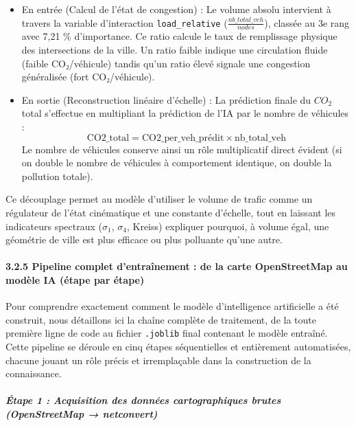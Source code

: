 \documentclass[10pt, a4paper]{article}
\providecommand{\tightlist}{}
\begin{document}
\begin{enumerate}
  \begin{itemize}
  \tightlist
  \item
    En entrée (Calcul de l'état de congestion) : Le volume absolu
    intervient à travers la variable d'interaction
    \texttt{load\_relative} (\(\frac{nb\_total\_veh}{nodes}\)), classée
    au 3e rang avec 7,21 \% d'importance. Ce ratio calcule le taux de
    remplissage physique des intersections de la ville. Un ratio faible
    indique une circulation fluide (faible CO₂/véhicule) tandis qu'un
    ratio élevé signale une congestion généralisée (fort CO₂/véhicule).
  \item
    En sortie (Reconstruction linéaire d'échelle) : La prédiction finale
    du \(CO_2\) total s'effectue en multipliant la prédiction de l'IA
    par le nombre de véhicules :
    \[\text{CO2\_total} = \text{CO2\_per\_veh\_prédit} \times \text{nb\_total\_veh}\]
    Le nombre de véhicules conserve ainsi un rôle multiplicatif direct
    évident (si on double le nombre de véhicules à comportement
    identique, on double la pollution totale).
  \end{itemize}
\end{enumerate}

Ce découplage permet au modèle d'utiliser le volume de trafic comme un
régulateur de l'état cinématique et une constante d'échelle, tout en
laissant les indicateurs spectraux (\(\sigma_1\), \(\sigma_4\), Kreiss)
expliquer pourquoi, à volume égal, une géométrie de ville est plus
efficace ou plus polluante qu'une autre.

\paragraph{3.2.5 Pipeline complet d'entraînement : de la carte
OpenStreetMap au modèle IA (étape par
étape)}\label{pipeline-complet-dentrauxeenement-de-la-carte-openstreetmap-au-moduxe8le-ia-uxe9tape-par-uxe9tape}

Pour comprendre exactement comment le modèle d'intelligence artificielle
a été construit, nous détaillons ici la chaîne complète de traitement,
de la toute première ligne de code au fichier \texttt{.joblib} final
contenant le modèle entraîné. Cette pipeline se déroule en cinq étapes
séquentielles et entièrement automatisées, chacune jouant un rôle précis
et irremplaçable dans la construction de la connaissance.

\subparagraph{Étape 1 : Acquisition des données cartographiques brutes
(OpenStreetMap →
netconvert)}\label{uxe9tape-1-acquisition-des-donnuxe9es-cartographiques-brutes-openstreetmap-netconvert}
\end{document}
